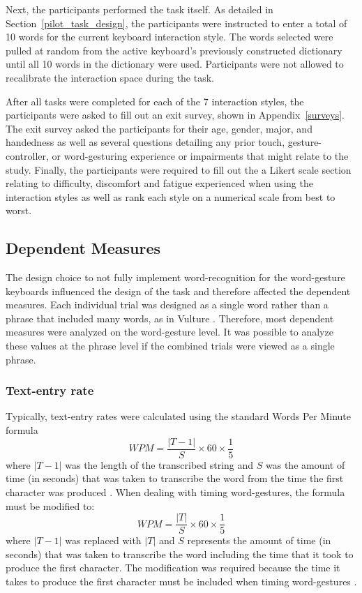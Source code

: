 Next, the participants performed the task itself. As detailed in Section~\ref{pilot_task_design}, the participants were instructed to enter a total of 10 words for the current keyboard interaction style. The words selected were pulled at random from the active keyboard's previously constructed dictionary until all 10 words in the dictionary were used. Participants were not allowed to recalibrate the interaction space during the task. 

After all tasks were completed for each of the 7 interaction styles, the participants were asked to fill out an exit survey, shown in Appendix~\ref{surveys}. The exit survey asked the participants for their age, gender, major, and handedness as well as several questions detailing any prior touch, gesture-controller, or word-gesturing experience or impairments that might relate to the study. Finally, the participants were required to fill out the a Likert scale section relating to difficulty, discomfort and fatigue experienced when using the interaction styles as well as rank each style on a numerical scale from best to worst.

\subsection{Dependent Measures} \label{pilot_dependent_measures}
The design choice to not fully implement word-recognition for the word-gesture keyboards influenced the design of the task and therefore affected the dependent measures. Each individual trial was designed as a single word rather than a phrase that included many words, as in Vulture \cite{ref_vulture}. Therefore, most dependent measures were analyzed on the word-gesture level. It was possible to analyze these values at the phrase level if the combined trials were viewed as a single phrase.

\subsubsection{Text-entry rate}
Typically, text-entry rates were calculated using the standard Words Per Minute formula
\begin{equation}
WPM = \frac{|T-1|}{S} \times 60 \times \frac{1}{5}
\end{equation}
where $|T-1|$ was the length of the transcribed string and $S$ was the amount of time (in seconds) that was taken to transcribe the word from the time the first character was produced \cite{ref_wpm_word_gesture_formula}. When dealing with timing word-gestures, the formula must be modified to:
\begin{equation} \label{WPM}
WPM = \frac{|T|}{S} \times 60 \times \frac{1}{5}
\end{equation}
where $|T-1|$ was replaced with $|T|$ and $S$ represents the amount of time (in seconds) that was taken to transcribe the word including the time that it took to produce the first character. The modification was required because the time it takes to produce the first character must be included when timing word-gestures \cite{ref_wpm_word_gesture_timing}.

